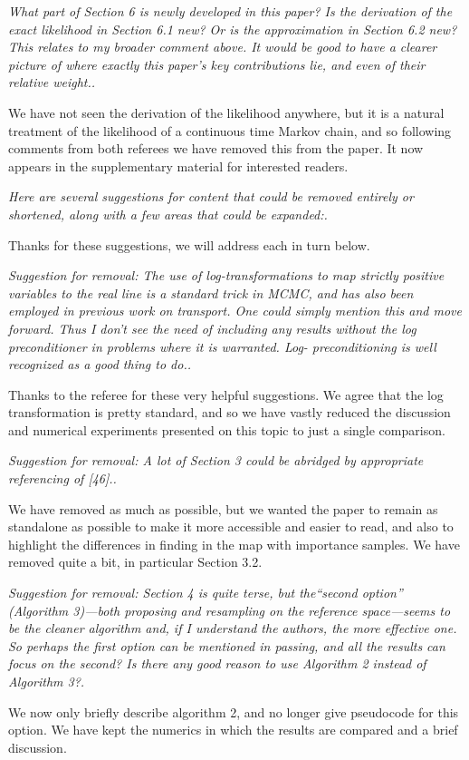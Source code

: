 \documentclass{article}
\newcommand{\comment}[2]{\vspace{0.6cm}{\bf Comment:} {\it #1.}

\vspace{0.3cm}{\bf Answer:} #2}
\begin{document}

\comment{What part of Section 6 is newly developed in this paper? Is the derivation of the exact likelihood in Section 6.1 new? Or is the approximation in Section 6.2 new? This relates to my broader comment above. It would be good to have a clearer picture of where exactly this paper’s key contributions lie, and even of their relative weight.}{We have not seen the derivation of the likelihood anywhere, but it is a natural treatment of the likelihood of a continuous time Markov chain, and so following comments from both referees we have removed this from the paper. It now appears in the supplementary material for interested readers.}


\comment{Here are several suggestions for content that could be removed entirely or shortened, along with a few areas that could be expanded:}{Thanks for these suggestions, we will address each in turn below.}


\comment{Suggestion for removal: The use of log-transformations to map strictly positive variables to the real line is a standard trick in MCMC, and has also been employed in previous work on transport. One could simply mention this and move forward. Thus I don’t see the need of including any results without the log preconditioner in problems where it is warranted. Log- preconditioning is well recognized as a good thing to do.}{Thanks to the referee for these very helpful suggestions. We agree that the log transformation is pretty standard, and so we have vastly reduced the discussion and numerical experiments presented on this topic to just a single comparison.}


\comment{Suggestion for removal: A lot of Section 3 could be abridged by appropriate referencing of [46].}{
  We have removed as much as possible, but we wanted the paper to remain as standalone as possible to make it more accessible and easier to read, and also to highlight the differences in finding in the map with importance samples. We have removed quite a bit, in particular Section 3.2.}


\comment{Suggestion for removal: Section 4 is quite terse, but the“second option” (Algorithm 3)—both proposing and resampling on the reference space—seems to be the cleaner algorithm and, if I understand the authors, the more effective one. So perhaps the first option can be mentioned in passing, and all the results can focus on the second? Is there any good reason to use Algorithm 2 instead of Algorithm 3?}{
We now only briefly describe algorithm 2, and no longer give pseudocode for this option. We have kept the numerics in which the results are compared and a brief discussion.}
\end{document}
